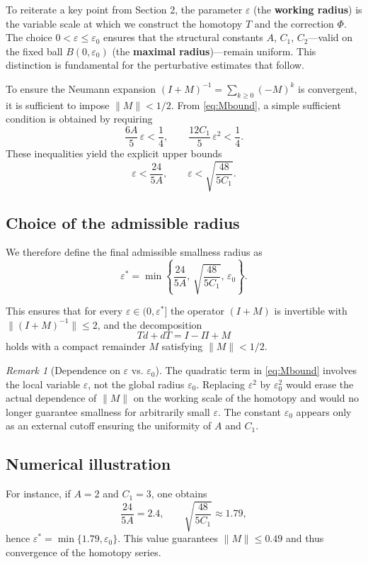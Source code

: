 \documentclass[10pt]{amsart}
\numberwithin{equation}{section}
\theoremstyle{remark}
\newtheorem{rmk}[theorem]{Remark}
\theoremstyle{definition}
\begin{document}
To reiterate a key point from Section 2, the parameter $\varepsilon$ (the \textbf{working radius}) is the variable scale at which we construct the homotopy $T$ and the correction $\Phi$. The choice $0 < \varepsilon \leq \varepsilon_0$ ensures that the structural constants $A$, $C_1$, $C_2$—valid on the fixed ball $B(0,\varepsilon_0)$ (the \textbf{maximal radius})—remain uniform. This distinction is fundamental for the perturbative estimates that follow.

To ensure the Neumann expansion
$(I+M)^{-1}=\sum_{k\ge0}(-M)^k$ is convergent, it is sufficient to impose
$\|M\|<1/2$.
From \eqref{eq:Mbound}, a simple sufficient condition is obtained by requiring
\[
\frac{6A}{5}\,\varepsilon < \frac{1}{4},
\qquad
\frac{12C_1}{5}\,\varepsilon^2 < \frac{1}{4}.
\]
These inequalities yield the explicit upper bounds
\[
\varepsilon < \frac{24}{5A},
\qquad
\varepsilon < \sqrt{\frac{48}{5C_1}}.
\]

\subsection{Choice of the admissible radius}

We therefore define the final admissible smallness radius as
\begin{equation}\label{eq:epsstar}
\varepsilon^\ast
= \min\left\{
\frac{24}{5A},\,
\sqrt{\frac{48}{5C_1}},\,
\varepsilon_0
\right\}.
\end{equation}

This ensures that for every $\varepsilon\in(0,\varepsilon^\ast]$
the operator $(I+M)$ is invertible with $\|(I+M)^{-1}\|\le2$,
and the decomposition
\[
T d + d T = I - \Pi + M
\]
holds with a compact remainder $M$ satisfying $\|M\|<1/2$.

\begin{rmk}[Dependence on $\varepsilon$ vs. $\varepsilon_0$]
The quadratic term in \eqref{eq:Mbound} involves the local variable
$\varepsilon$, not the global radius $\varepsilon_0$.
Replacing $\varepsilon^2$ by $\varepsilon_0^2$ would erase the actual
dependence of $\|M\|$ on the working scale of the homotopy
and would no longer guarantee smallness for arbitrarily small
$\varepsilon$.
The constant $\varepsilon_0$ appears only as an external cutoff
ensuring the uniformity of $A$ and $C_1$.
\end{rmk}

\subsection{Numerical illustration}
For instance, if $A=2$ and $C_1=3$, one obtains
\[
\frac{24}{5A}=2.4, \qquad
\sqrt{\frac{48}{5C_1}}\approx1.79,
\]
hence $\varepsilon^\ast=\min\{1.79,\varepsilon_0\}$.
This value guarantees $\|M\|\le0.49$ and thus convergence of the homotopy
series.
\end{document}
